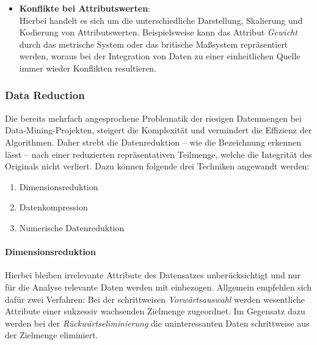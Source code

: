 \begin{itemize}
\item \textbf{Konflikte bei Attributswerten}:
\\ Hierbei handelt es sich um die unterschiedliche Darstellung, Skalierung und Kodierung von Attributswerten. Beispielsweise kann das Attribut \textit{Gewicht} durch das metrische System oder das britische Maßsystem repräsentiert werden, woraus bei der Integration von Daten zu einer einheitlichen Quelle immer wieder Konflikten resultieren. 
\end{itemize}

\subsubsection{Data Reduction}
\label{dr}
Die bereits mehrfach angesprochene Problematik der riesigen Datenmengen bei Data-Mining-Projekten, steigert die Komplexität und vermindert die Effizienz der Algorithmen. Daher strebt die Datenreduktion -- wie die Bezeichnung erkennen lässt -- nach einer reduzierten repräsentativen Teilmenge, welche die Integrität des Originals nicht verliert. Dazu können folgende drei Techniken angewandt werden: 

\begin{enumerate}

\item Dimensionsreduktion 

\item Datenkompression

\item Numerische Datenreduktion

\end{enumerate}

\paragraph{Dimensionsreduktion}
Hierbei bleiben irrelevante Attribute des Datensatzes unberücksichtigt und nur für die Analyse relevante Daten werden mit einbezogen. Allgemein empfehlen sich dafür zwei Verfahren: Bei der schrittweisen \textit{Vorwärtsauswahl} werden wesentliche Attribute einer sukzessiv wachsenden Zielmenge zugeordnet. Im Gegensatz dazu werden bei der \textit{Rückwärtseliminierung} die uninteressanten Daten schrittweise aus der Zielmenge eliminiert. 

